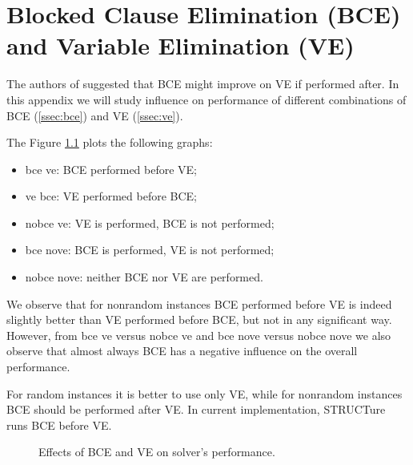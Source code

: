\chapter{Blocked Clause Elimination (BCE) and Variable Elimination (VE)}
\label{chap:bce-ve}

The authors of \cite{Jarvisalo_blockedclause} suggested that BCE
might improve on VE if performed after. In this appendix we will
study influence on performance of different combinations of BCE
(\ref{ssec:bce}) and VE (\ref{ssec:ve}).

The Figure \ref{fig:bce-ve} plots the following graphs:
\begin{itemize}
  \item \textsf{bce ve}: BCE performed before VE;
  \item \textsf{ve bce}: VE performed before BCE;
  \item \textsf{nobce ve}: VE is performed, BCE is not performed;
  \item \textsf{bce nove}: BCE is performed, VE is not performed;
  \item \textsf{nobce nove}: neither BCE nor VE are performed.
\end{itemize}

We observe that for nonrandom instances BCE performed before VE
is indeed slightly better than VE performed before BCE, but not
in any significant way.  However, from \textsf{bce ve} versus
\textsf{nobce ve} and \textsf{bce nove} versus \textsf{nobce nove}
we also observe that almost always BCE has a negative influence on
the overall performance.

For random instances it is better to use only VE, while for
nonrandom instances BCE should be performed after VE. In current
implementation, STRUCTure runs BCE before VE.

\begin{figure}
  \centering
  \caption{Effects of BCE and VE on solver's performance.}
  \label{fig:bce-ve}
\end{figure}
